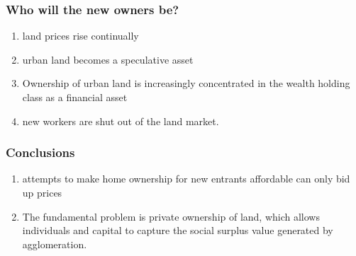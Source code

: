 \documentclass[notes]{beamer}
\begin{document}
\begin{frame}\frametitle{Who will the new owners be?}


\begin{enumerate}
\item  land prices rise continually
\item urban land becomes a speculative asset
\item Ownership of urban land is increasingly concentrated in the wealth holding class as a financial asset 
\item new workers are shut out of the land market.
\end{enumerate}



\end{frame}

\begin{frame}\frametitle{Conclusions}
\begin{enumerate}
\item attempts to make home ownership for new entrants affordable can only bid up prices 
\item The fundamental problem is private ownership of land, which allows individuals and capital to capture the social surplus value generated by agglomeration.
\end{enumerate}



\end{frame}

\begin{frame}\frametitle{}

\end{frame}
\end{document}
